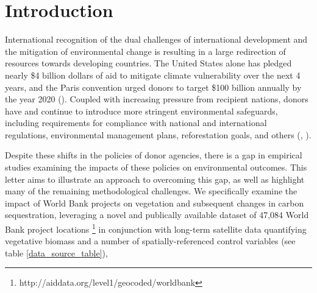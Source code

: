 \documentclass{article}\usepackage[]{graphicx}\usepackage[]{color}
\newenvironment{knitrout}{}{}  %
\begin{document}
\begin{knitrout}
\section{Introduction}
International recognition of the dual challenges of international development and the mitigation of environmental change is resulting in a large redirection of resources towards developing countries. 
The United States alone has pledged nearly \$4 billion dollars of aid to mitigate climate vulnerability over the next 4 years, and the Paris convention urged donors to target \$100 billion annually by the year 2020 (\cite{royal_united_2015}). 
Coupled with increasing pressure from recipient nations, donors have and continue to introduce more stringent environmental safeguards, including requirements for compliance with national and international regulations, environmental management plans, reforestation goals, and others (\cite{nielson_delegation_2003}, \cite{gutner_explaining_2005}).
\par
Despite these shifts in the policies of donor agencies, there is a gap in empirical studies examining the impacts of these policies on environmental outcomes.  
This letter aims to illustrate an approach to overcoming this gap, as well as highlight many of the remaining methodological challenges.
We specifically examine the impact of World Bank projects on vegetation and subsequent changes in carbon sequestration, leveraging a novel and publically available dataset of 47,084 World Bank project locations \footnote{http://aiddata.org/level1/geocoded/worldbank} in conjunction with long-term satellite data quantifying vegetative biomass and a number of spatially-referenced control variables (see table \ref{data_source_table}),

\begin{table}


\end{table}
\end{knitrout}
\end{document}
